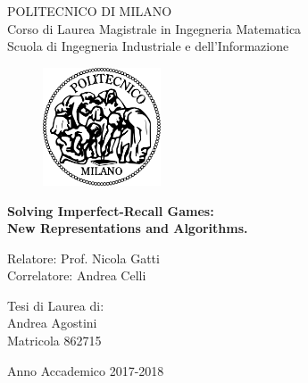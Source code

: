 \thispagestyle{empty}
\vspace*{-1.5cm} \bfseries{
\begin{center}
  \large
  POLITECNICO DI MILANO\\
  \normalsize
  Corso di Laurea Magistrale in Ingegneria Matematica\\
  Scuola di Ingegneria Industriale e dell'Informazione\\
  \begin{figure}[htbp]
    \begin{center}
      \includegraphics[width=3.5cm]{./images/logopm}
    \end{center}
  \end{figure}
  \vspace*{0.3cm} \LARGE



  \textbf{Solving Imperfect-Recall Games: \\New Representations and Algorithms.}


  \vspace*{.75truecm} \large

\end{center}
\vspace*{3.0cm} \large
\begin{flushleft}


  Relatore: Prof. Nicola Gatti \\
  Correlatore: Andrea Celli

\end{flushleft}
\vspace*{1.0cm}
\begin{flushright}


  Tesi di Laurea di:\\ Andrea Agostini\\ Matricola 862715 \\


\end{flushright}
\vspace*{0.5cm}
\begin{center}



  Anno Accademico 2017-2018
\end{center} \clearpage
}
